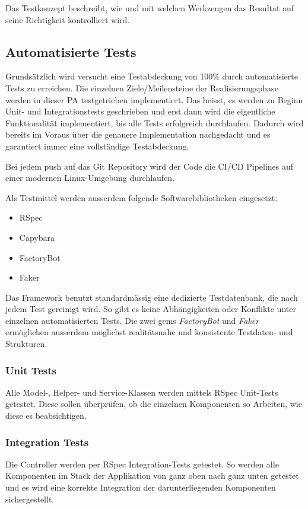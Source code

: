 Das Testkonzept beschreibt, wie und mit welchen Werkzeugen das Resultat auf seine Richtigkeit kontrolliert wird.

\subsection{Automatisierte Tests}

Grundsätzlich wird versucht eine Testabdeckung von 100\% durch automatisierte Tests zu erreichen. Die einzelnen
Ziele/Meilensteine der Realisierungsphase werden in dieser PA testgetrieben implementiert. Das heisst, es werden zu Beginn
Unit- und Integrationstests geschrieben und erst dann wird die eigentliche Funktionalität implementiert, bis alle Tests erfolgreich durchlaufen. Dadurch wird
bereits im Voraus über die genauere Implementation nachgedacht und es garantiert immer eine vollständige Testabdeckung.

Bei jedem push auf das Git Repository wird der Code die CI/CD Pipelines auf einer modernen Linux-Umgebung durchlaufen.

Als Testmittel werden ausserdem folgende Softwarebibliotheken eingesetzt:
\begin{itemize}
    \item RSpec
    \item Capybara
    \item FactoryBot
    \item Faker
\end{itemize}

Das Framework benutzt standardmässig eine dedizierte Testdatenbank, die nach jedem Test gereinigt wird. So gibt es keine Abhängigkeiten
oder Konflikte unter einzelnen automatisierten Tests. Die zwei gems \emph{FactoryBot} und \emph{Faker} ermöglichen ausserdem möglichst
realitätsnahe und konsistente Testdaten- und Strukturen.

\subsubsection{Unit Tests}
Alle Model-, Helper- und Service-Klassen werden mittels RSpec Unit-Tests getestet. Diese sollen überprüfen,
ob die einzelnen Komponenten so Arbeiten, wie diese es beabsichtigen.

\subsubsection{Integration Tests}
Die Controller werden per RSpec Integration-Tests getestet. So werden alle Komponenten im Stack der Applikation von ganz oben
nach ganz unten getestet und es wird eine korrekte Integration der darunterliegenden Komponenten sichergestellt.

